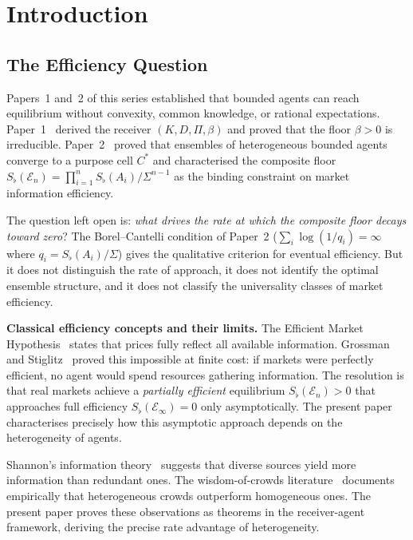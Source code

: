 \documentclass[twocolumn,11pt,a4paper]{article}
\theoremstyle{remark}
\newcommand{\Sflat}{S_{\flat}}
\newcommand{\Ens}{\mathcal{E}}
\begin{document}
\tableofcontents

\bigskip

\section{Introduction}
\label{sec:intro}

\subsection{The Efficiency Question}
\label{sec:intro:eff}

Papers~1 and~2 of this series established that bounded agents can reach
equilibrium without convexity, common knowledge, or rational expectations.
Paper~1~\cite{sachikonye2025agents} derived the receiver $(K,D,\Pi,\beta)$
and proved that the floor $\beta>0$ is irreducible.  Paper~2~\cite{sachikonye2025market}
proved that ensembles of heterogeneous bounded agents converge to a purpose
cell $C^*$ and characterised the composite floor
$\Sflat(\Ens_n) = \prod_{i=1}^n \Sflat(A_i)/\Sigma^{n-1}$ as the binding
constraint on market information efficiency.

The question left open is: \emph{what drives the rate at which the composite
floor decays toward zero}?  The Borel--Cantelli condition of Paper~2
($\sum_i \log(1/q_i) = \infty$ where $q_i = \Sflat(A_i)/\Sigma$) gives
the qualitative criterion for eventual efficiency.  But it does not
distinguish the rate of approach, it does not identify the optimal ensemble
structure, and it does not classify the universality classes of market
efficiency.

\medskip
\noindent\textbf{Classical efficiency concepts and their limits.}
The Efficient Market Hypothesis~\cite{fama1970} states that prices fully
reflect all available information.  Grossman and Stiglitz~\cite{grossmanstiglitz1980}
proved this impossible at finite cost: if markets were perfectly efficient,
no agent would spend resources gathering information.  The resolution is that
real markets achieve a \emph{partially efficient} equilibrium
$\Sflat(\Ens_n) > 0$ that approaches full efficiency $\Sflat(\Ens_\infty)=0$
only asymptotically.  The present paper characterises precisely how this
asymptotic approach depends on the heterogeneity of agents.

Shannon's information theory~\cite{shannon1948} suggests that diverse sources
yield more information than redundant ones.  The wisdom-of-crowds
literature~\cite{surowiecki2004} documents empirically that heterogeneous
crowds outperform homogeneous ones.  The present paper proves these
observations as theorems in the receiver-agent framework, deriving the
precise rate advantage of heterogeneity.
\end{document}
